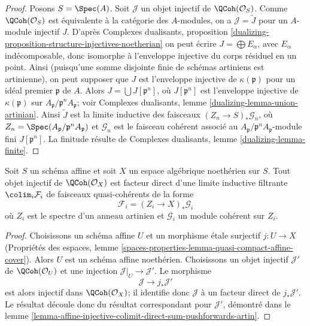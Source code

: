 \begin{proof}
Posons $S = \Spec(A)$. Soit $\mathcal{J}$ un objet injectif de
$\QCoh(\mathcal{O}_S)$. Comme $\QCoh(\mathcal{O}_S)$ est
\'equivalente \`a la cat\'egorie des $A$-modules, on a
$\mathcal{J}=\widetilde{J}$ pour un $A$-module injectif $J$.
D'apr\`es Complexes dualisants, proposition
\ref{dualizing-proposition-structure-injectives-noetherian}
on peut \'ecrire $J = \bigoplus E_\alpha$, avec $E_\alpha$ ind\'ecomposable,
donc isomorphe \`a l'enveloppe injective du corps r\'esiduel en un point.
Ainsi (puisqu'une somme disjointe finie de sch\'emas artiniens est
artinienne), on peut supposer que $J$ est l'enveloppe injective de
$\kappa(\mathfrak p)$ pour un id\'eal premier $\mathfrak p$ de $A$.
Alors $J = \bigcup J[\mathfrak p^n]$, o\`u $J[\mathfrak p^n]$ est
l'enveloppe injective de $\kappa(\mathfrak p)$ sur
$A_\mathfrak p/\mathfrak p^nA_\mathfrak p$; voir
Complexes dualisants, lemme \ref{dualizing-lemma-union-artinian}.
Ainsi $\widetilde{J}$ est la limite inductive des faisceaux
$(Z_n \to S)_*\mathcal{G}_n$, o\`u
$Z_n = \Spec(A_\mathfrak p/\mathfrak p^nA_\mathfrak p)$ et
$\mathcal{G}_n$ est le faisceau coh\'erent associ\'e au
$A_\mathfrak p/\mathfrak p^nA_\mathfrak p$-module fini
$J[\mathfrak p^n]$. La finitude r\'esulte de
Complexes dualisants, lemme \ref{dualizing-lemma-finite}.
\end{proof}

\begin{lemma}
\label{lemma-injective-colimit-direct-sum-pushforwards-artin}
Soit $S$ un sch\'ema affine et soit $X$ un espace alg\'ebrique noeth\'erien
sur $S$. Tout objet injectif de $\QCoh(\mathcal{O}_X)$ est facteur direct
d'une limite inductive filtrante $\colim_i \mathcal{F}_i$ de faisceaux
quasi-coh\'erents de la forme
$$
\mathcal{F}_i = (Z_i \to X)_*\mathcal{G}_i
$$
o\`u $Z_i$ est le spectre d'un anneau artinien et $\mathcal{G}_i$ un module
coh\'erent sur $Z_i$.
\end{lemma}

\begin{proof}
Choisissons un sch\'ema affine $U$ et un morphisme \'etale surjectif
$j : U \to X$ (Propri\'et\'es des espaces, lemme
\ref{spaces-properties-lemma-quasi-compact-affine-cover}).
Alors $U$ est un sch\'ema affine noeth\'erien. Choisissons un objet injectif
$\mathcal{J}'$ de $\QCoh(\mathcal{O}_U)$ et une injection
$\mathcal{J}|_U \to \mathcal{J}'$. Le morphisme
$$
\mathcal{J} \to j_*\mathcal{J}'
$$
est alors injectif dans $\QCoh(\mathcal{O}_X)$; il identifie donc
$\mathcal{J}$ \`a un facteur direct de $j_*\mathcal{J}'$.
Le r\'esultat d\'ecoule donc du r\'esultat correspondant pour
$\mathcal{J}'$, d\'emontr\'e dans le lemme
\ref{lemma-affine-injective-colimit-direct-sum-pushforwards-artin}.
\end{proof}

